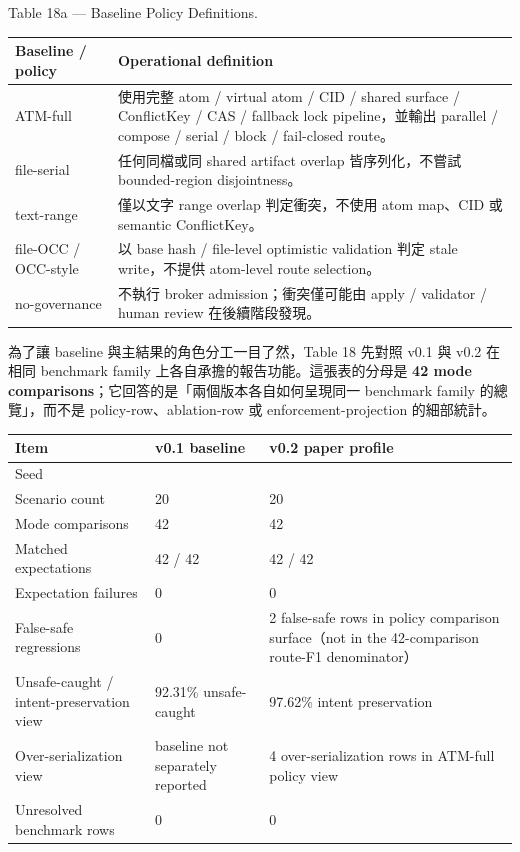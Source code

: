 \documentclass[a4paper,fontset=none]{ctexart}
\begin{document}
Table 18a --- Baseline Policy Definitions.

\begingroup
\footnotesize
{}
\begin{longtable}{L{0.28\textwidth}L{0.28\textwidth}}
\toprule
Baseline / policy & Operational definition \\
\midrule
ATM-full & 使用完整 atom / virtual atom / CID / shared surface / ConflictKey / CAS / fallback lock pipeline，並輸出 parallel / compose / serial / block / fail-closed route。 \\
file-serial & 任何同檔或同 shared artifact overlap 皆序列化，不嘗試 bounded-region disjointness。 \\
text-range & 僅以文字 range overlap 判定衝突，不使用 atom map、CID 或 semantic ConflictKey。 \\
file-OCC / OCC-style & 以 base hash / file-level optimistic validation 判定 stale write，不提供 atom-level route selection。 \\
no-governance & 不執行 broker admission；衝突僅可能由 apply / validator / human review 在後續階段發現。 \\
\bottomrule
\end{longtable}
\endgroup

為了讓 baseline 與主結果的角色分工一目了然，Table 18 先對照 v0.1 與 v0.2 在相同 benchmark family 上各自承擔的報告功能。這張表的分母是 \textbf{42 mode comparisons}；它回答的是「兩個版本各自如何呈現同一 benchmark family 的總覽」，而不是 policy-row、ablation-row 或 enforcement-projection 的細部統計。

\smallskip{}\par\smallskip

\begingroup
\footnotesize
{}
\begin{longtable}{L{0.28\textwidth}L{0.28\textwidth}L{0.28\textwidth}}
\toprule
Item & v0.1 baseline & v0.2 paper profile \\
\midrule
Seed & \texttt{} & \texttt{} \\
Scenario count & 20 & 20 \\
Mode comparisons & 42 & 42 \\
Matched expectations & 42 / 42 & 42 / 42 \\
Expectation failures & 0 & 0 \\
False-safe regressions & 0 & 2 false-safe rows in policy comparison surface（not in the 42-comparison route-F1 denominator） \\
Unsafe-caught / intent-preservation view & 92.31\% unsafe-caught & 97.62\% intent preservation \\
Over-serialization view & baseline not separately reported & 4 over-serialization rows in ATM-full policy view \\
Unresolved benchmark rows & 0 & 0 \\
\bottomrule
\end{longtable}
\endgroup
\end{document}
